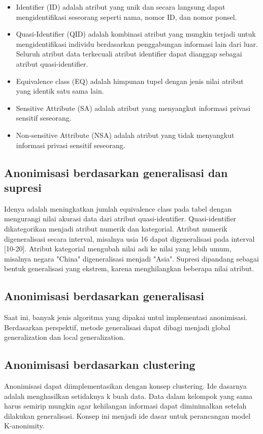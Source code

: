 \begin{itemize}
\item Identifier (ID) adalah atribut yang unik dan secara langsung dapat mengidentifikasi seseorang seperti nama, nomor ID, dan nomor ponsel.
\item Quasi-Identifier (QID) adalah kombinasi atribut yang mungkin terjadi untuk mengidentifikasi individu berdasarkan penggabungan informasi lain dari luar. Seluruh atribut data terkecuali atribut identifier dapat dianggap sebagai atribut quasi-identifier.
\item Equivalence class (EQ) adalah himpunan tupel 
dengan jenis nilai atribut yang identik satu sama lain.
\item Sensitive Attribute (SA) adalah atribut yang menyangkut informasi privasi sensitif seseorang.
\item Non-sensitive Attribute (NSA) adalah atribut yang tidak menyangkut informasi privasi sensitif seseorang.
\end{itemize}

\newpage
\subsection{Anonimisasi berdasarkan generalisasi dan supresi}
Idenya adalah meningkatkan jumlah equivalence class pada tabel dengan mengurangi nilai akurasi data dari atribut quasi-identifier. Quasi-identifier dikategorikan menjadi atribut numerik dan kategorial. Atribut numerik digeneralisasi secara interval, misalnya usia 16 dapat digeneralisasi pada interval [10-20]. Atribut kategorial mengubah nilai asli ke nilai yang lebih umum, misalnya negara "China" digeneralisasi menjadi "Asia". Supresi dipandang sebagai bentuk generalisasi yang ekstrem, karena menghilangkan beberapa nilai atribut.

\subsection{Anonimisasi berdasarkan generalisasi}
Saat ini, banyak jenis algoritma yang dipakai untul implementasi  anonimisasi. Berdasarkan perspektif, metode generalisasi dapat dibagi menjadi global generalization dan local generalization. 

\subsection{Anonimisasi berdasarkan clustering}
Anonimisasi dapat diimplementasikan dengan konsep clustering. Ide dasarnya adalah menghasilkan setidaknya k buah data. Data dalam kelompok yang sama harus semirip mungkin agar kehilangan informasi dapat diminimalkan setelah dilakukan generalisasi. Konsep ini menjadi ide dasar untuk perancangan model K-anonimity.

